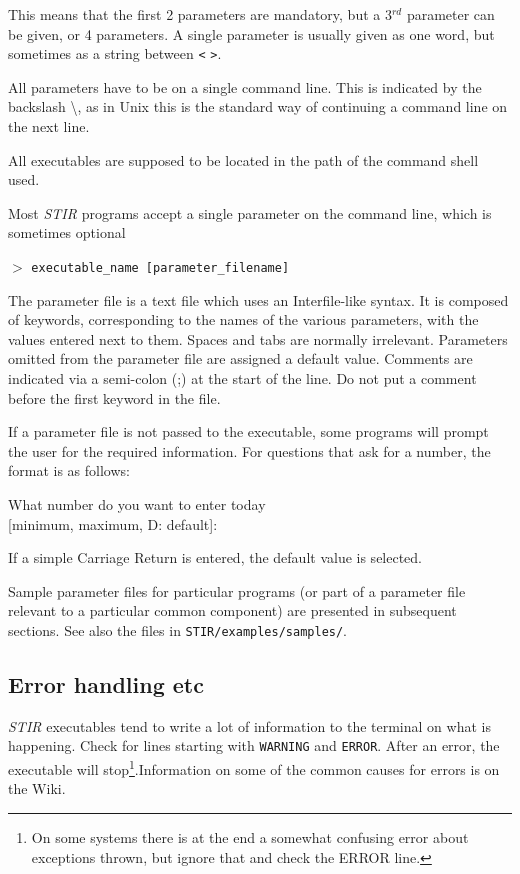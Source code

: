 \documentclass{article}
\newcommand{\tab}{\hspace{5mm}}
\newcommand{\cmdline}[1]{\par \noindent $>$ \texttt{#1}\par}
\begin{document}
This means that the first 2 parameters are mandatory, but a 3$^{rd}$ 
parameter can be given, or 4 parameters. A single parameter is 
usually given as one word, but sometimes as a string between 
\texttt{<} \texttt{>}. 


All parameters have to be on a single command line. This is indicated 
by the backslash {\textbackslash}, as in Unix this is the standard way 
of continuing a command line on the next line.


All executables are supposed to be located in the path of the 
command shell used.


Most \textit{STIR} programs accept a single parameter on the command 
line, which is sometimes optional

\cmdline{executable\_name [parameter\_filename]}


The parameter file is a text file which uses an Interfile-like 
syntax. It is composed of keywords, corresponding to the names 
of the various parameters, with the values entered next to them. 
Spaces and tabs are normally irrelevant. Parameters omitted from 
the parameter file are assigned a default value. 
Comments are indicated via a semi-colon (;) at the start of the line. Do
not put a comment before the first keyword in the file.

If a parameter file is not passed to the executable, some
programs will prompt the user 
for the required information. For questions that 
ask for a number, the format is as follows:


\tab What number do you want to enter today \\
\tab [minimum, maximum, D: default]:


If a simple Carriage Return is entered, the default value is 
selected.


Sample parameter files for particular programs (or part of a 
parameter file relevant to a particular common component) are 
presented in subsequent sections. See also the files in \texttt{STIR/examples/samples/}.


\subsection{
Error handling etc}
\textit{STIR} executables tend to write a lot of information to the terminal on what is happening.
Check for lines starting with \texttt{WARNING} and \texttt{ERROR}. 
After an error, the executable will stop\footnote{On some systems there is at the end
a somewhat confusing error about
exceptions thrown, but ignore that and check the ERROR line.}.Information on some of the common
causes for errors is on the Wiki.
\end{document}
